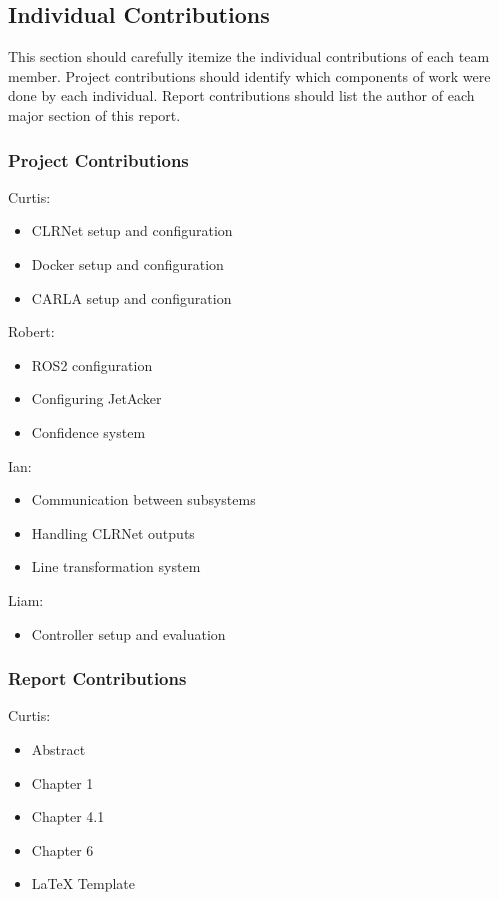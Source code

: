 \documentclass[titlepage, draft]{article}
\begin{document}
\subsection{Individual Contributions}
This section should carefully itemize the individual contributions of each team member. Project contributions should identify which components of work were done by each  individual. Report contributions should list the author of  each major section of this report.

\subsubsection{Project Contributions}

Curtis:
\begin{itemize}
	\item CLRNet setup and configuration
	\item Docker setup and configuration
	\item CARLA setup and configuration
\end{itemize}

Robert:
\begin{itemize}
	\item ROS2 configuration
	\item Configuring JetAcker
	\item Confidence system
\end{itemize}

Ian:
\begin{itemize}
	\item Communication between subsystems
	\item Handling CLRNet outputs
	\item Line transformation system
\end{itemize}

Liam:
\begin{itemize}
	\item Controller setup and evaluation
\end{itemize}


\subsubsection{Report Contributions}
Curtis:
\begin{itemize}
	\item Abstract
	\item Chapter 1
	\item Chapter 4.1
	\item Chapter 6
	\item LaTeX Template
\end{itemize}
\end{document}
